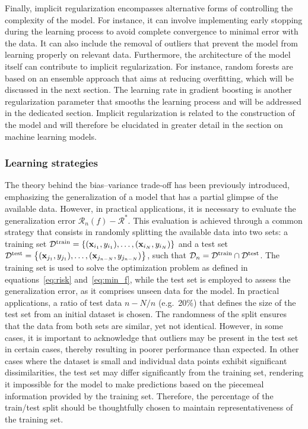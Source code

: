 \documentclass[main]{subfiles}
\begin{document}
Finally, implicit regularization encompasses alternative forms of controlling the complexity of the model. For instance, it can involve implementing early stopping during the learning process to avoid complete convergence to minimal error with the data. It can also include the removal of outliers that prevent the model from learning properly on relevant data. Furthermore, the architecture of the model itself can contribute to implicit regularization. For instance, random forests are based on an ensemble approach that aims at reducing overfitting, which will be discussed in the next section. The learning rate in gradient boosting is another regularization parameter that smooths the learning process and will be addressed in the dedicated section. Implicit regularization is related to the construction of the model and will therefore be elucidated in greater detail in the section on machine learning models.

\subsubsection{Learning strategies}

The theory behind the bias--variance trade-off has been previously introduced, emphasizing the generalization of a model that has a partial glimpse of the available data. However, in practical applications, it is necessary to evaluate the generalization error $\mathcal{R}_n(f)-\mathcal{R}^*$. This evaluation is achieved through a common strategy that consists in randomly splitting the available data into two sets: a training set $\mathcal{D}^{\text{train}}=\left\{{(\mathbf{x}_{i_1},y_{i_1}),\ldots,(\mathbf{x}_{i_N},y_{i_N})}\right\}$ and a test set $\mathcal{D}^{\text{test}}=\left\{(\mathbf{x}_{j_1},y_{j_1}),\ldots,(\mathbf{x}_{j_{n-N}},y_{j_{n-N}})\right\}$, such that $\mathcal{D}_n = \mathcal{D}^{\text{train}} \cap \mathcal{D}^{\text{test}}$. The training set is used to solve the optimization problem as defined in equations~\ref{eq:risk} and~\ref{eq:min_f}, while the test set is employed to assess the generalization error, as it comprises unseen data for the model. In practical applications, a ratio of test data $n-N/n$ (e.g.\ {20\%}) that defines the size of the test set from an initial dataset is chosen. The randomness of the split ensures that the data from both sets are similar, yet not identical. However, in some cases, it is important to acknowledge that outliers may be present in the test set in certain cases, thereby resulting in poorer performance than expected. In other cases where the dataset is small and individual data points exhibit significant dissimilarities, the test set may differ significantly from the training set, rendering it impossible for the model to make predictions based on the piecemeal information provided by the training set. Therefore, the percentage of the train/test split should be thoughtfully chosen to maintain representativeness of the training set.
\end{document}
